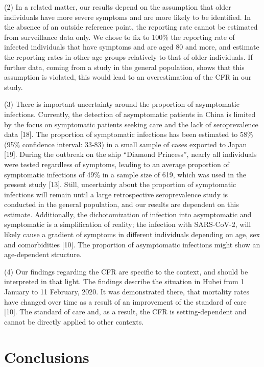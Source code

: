 \documentclass{article}
\begin{document}
(2) In a related matter, our results depend on the assumption that older individuals have more severe symptoms and are more likely to be identified. In the absence of an outside reference point, the reporting rate cannot be estimated from surveillance data only. We chose to fix to 100\% the reporting rate of infected individuals that have symptoms and are aged 80 and more, and estimate the reporting rates in other age groups relatively to that of older individuals. If further data, coming from a study in the general population, shows that this assumption is violated, this would lead to an overestimation of the CFR in our study.

(3) There is important uncertainty around the proportion of asymptomatic infections. Currently, the detection of asymptomatic patients in China is limited by the focus on symptomatic patients seeking care and the lack of seroprevalence data [18]. The proportion of symptomatic infections has been estimated to 58\% (95\% confidence interval: 33-83) in a small sample of cases exported to Japan [19]. During the outbreak on the ship “Diamond Princess”, nearly all individuals were tested regardless of symptoms, leading to an average proportion of symptomatic infections of 49\% in a sample size of 619, which was used in the present study [13]. Still, uncertainty about the proportion of symptomatic infections will remain until a large retrospective seroprevalence study is conducted in the general population, and our results are dependent on this estimate. Additionally, the dichotomization of infection into asymptomatic and symptomatic is a simplification of reality; the infection with SARS-CoV-2, will likely cause a gradient of symptoms in different individuals depending on age, sex and comorbidities [10]. The proportion of asymptomatic infections might show an age-dependent structure.

(4) Our findings regarding the CFR are specific to the context, and should be interpreted in that light. The findings describe the situation in Hubei from 1 January to 11 February, 2020. It was demonstrated there, that mortality rates have changed over time as a result of an improvement of the standard of care [10]. The standard of care and, as a result, the CFR is setting-dependent and cannot be directly applied to other contexts.

\section*{Conclusions}
\end{document}
